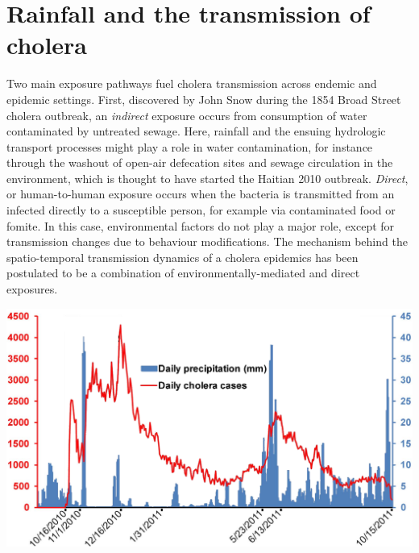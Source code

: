 \section{Rainfall and the transmission of cholera}\label{sec:rainfall-cholera-transmission}
Two main exposure pathways fuel cholera transmission across endemic and epidemic settings.
First, discovered by John Snow during the 1854 Broad Street cholera outbreak, an \textit{indirect} exposure occurs from consumption of water contaminated by untreated sewage\cite{Snow:ModeCommunicationCholera:1855}. Here, rainfall and the ensuing hydrologic transport processes might play a role in water contamination, for instance through the washout of open-air defecation sites and sewage circulation in the environment, which is thought to have started the Haitian 2010 outbreak\cite{Piarroux:UnderstandingCholeraEpidemic:2011}.
\textit{Direct}, or human-to-human exposure occurs when the bacteria is transmitted from an infected directly to a susceptible person, for example via contaminated food or fomite. In this case, environmental factors do not play a major role, except for transmission changes due to behaviour modifications.
The mechanism behind the spatio-temporal transmission dynamics of a cholera epidemics has been postulated to be a combination of environmentally-mediated and direct exposures.
 \begin{marginfigure}
\centering
\includegraphics[width=\textwidth]{fig/cholera-rainfall.png}
\label{rain}
\end{marginfigure}
